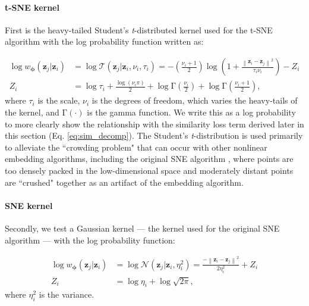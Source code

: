 \documentclass[11pt,a4paper,twoside]{book}
\begin{document}
\begin{doublespace}
\begin{appendices}
\paragraph{t-SNE kernel} First is the heavy-tailed Student's \textit{t}-distributed kernel used for the t-SNE algorithm \citep{maaten2008tsne} with the log probability function written as:

\begin{subequations}
    \begin{align}
    \log w_{\boldsymbol{\phi}}(\mathbf{z}_j | \mathbf{z}_i) &= \log \mathcal{T}(\mathbf{z
    }_j | \mathbf{z}_i, \nu_i, \tau_i) = -\left(\frac{\nu_i + 1}{2}\right)\log \left(1+\frac{\left\|\mathbf{z}_{i} - \mathbf{z}_{j} \right\|^{2}}{\tau_i \nu_i}\right) - Z_i \label{eq:tsne_logp}\\
    Z_i &= \log\tau_i + \frac{\log(\nu_i\pi)}{2} + \log \mathrm{\Gamma}\left(\frac{\nu_i}{2}\right) + \log \mathrm{\Gamma}\left(\frac{\nu_i + 1}{2}\right)\label{eq:tsne_z},
\end{align}
\end{subequations}
where $\tau_i$ is the scale, $\nu_i$ is the degrees of freedom, which varies the heavy-tails of the kernel, and $\mathrm{\Gamma}(\cdot)$ is the gamma function. We write this as a log probability to more clearly show the relationship with the similarity loss term derived later in this section (Eq. \ref{eq:sim_decomp}). The Student's \textit{t}-distribution is used primarily to alleviate the ``crowding problem" \citep{maaten2008tsne} that can occur with other nonlinear embedding algorithms, including the original SNE algorithm \citep{hinton2003stochastic}, where points are too densely packed in the low-dimensional space and moderately distant points are ``crushed" together as an artifact of the embedding algorithm. 

\paragraph{SNE kernel} Secondly, we test a Gaussian kernel --- the kernel used for the original SNE algorithm \citep{hinton2003stochastic, maaten2008tsne} --- with the log probability function:

\begin{subequations}
    \begin{align}
        \log w_{\boldsymbol{\phi}}(\mathbf{z}_j | \mathbf{z}_i) &= \log \mathcal{N}(\mathbf{z}_j | \mathbf{z}_i, \eta_i^{2}) = \frac{-\left\|\mathbf{z}_{i} - \mathbf{z}_{j} \right\|^{2}}{2 \eta_i^{2}} + Z_i \label{eq:sne_logp}\\
        Z_i &= \log\eta_i + \log\sqrt{2 \pi} \label{eq:sne_z},
    \end{align}
\end{subequations}
where $\eta_i^2$ is the variance. 


\end{appendices}
\end{doublespace}
\end{document}
